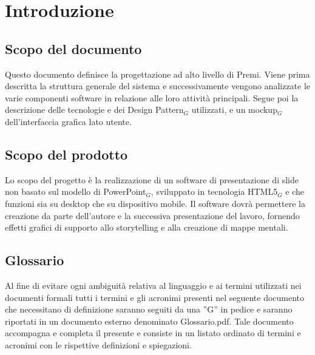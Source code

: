 \section{Introduzione}
\subsection{Scopo del documento}
Questo documento definisce la progettazione ad alto livello di Premi. Viene prima descritta la struttura generale del sistema e successivamente vengono analizzate le varie componenti software in relazione alle loro attività principali. Segue poi la descrizione delle tecnologie e dei Design Pattern$_{G}$ utilizzati, e un mockup$_{G}$ dell'interfaccia grafica lato utente.

\subsection{Scopo del prodotto}
Lo scopo del progetto è la realizzazione di un software di presentazione di slide non basato sul modello di PowerPoint$_{G}$, sviluppato in tecnologia HTML5$_{G}$ e che funzioni sia su desktop che su dispositivo mobile. Il software dovrà permettere la creazione da parte dell'autore e la successiva presentazione del lavoro, fornendo effetti grafici di supporto allo storytelling e alla creazione di mappe mentali. 

\subsection{Glossario}
Al fine di evitare ogni ambiguità relativa al linguaggio e ai termini utilizzati nei documenti formali tutti i termini e gli acronimi presenti nel seguente documento che necessitano di definizione saranno seguiti da una ”G” in pedice e saranno riportati in un documento esterno denominato Glossario.pdf. Tale documento accompagna e completa il presente e consiste in un listato ordinato di termini e acronimi con le rispettive definizioni e spiegazioni.
	
	
